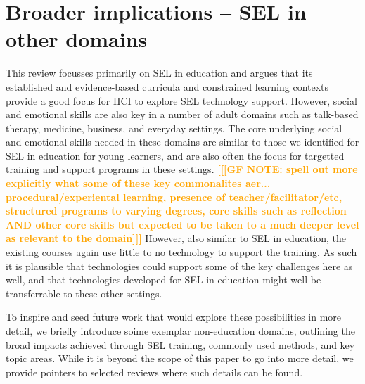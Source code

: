\documentclass[prodmode,acmtochi]{acmsmall}
\newcommand{\Geraldine}[1]{\textrm{\textbf{\textcolor{Orange}{[[#1]]}}}}
\newcommand{\rephrase}[1]{\textrm{\textrm{\textcolor{gray}{#1}}}}
\begin{document}
\section{Broader implications -- SEL in other domains}
\label{sec:linkDomains}
This review focusses primarily on SEL in education and argues that its established and evidence-based curricula and constrained learning contexts provide a good focus for HCI to explore SEL technology support. However, social and emotional skills are also key in a number of adult domains such as talk-based therapy, medicine, business, and everyday settings. The core underlying social and emotional skills needed in these domains are similar to those we identified for SEL in education for young learners, and are also often the focus for targetted training and support programs in these settings. 
\Geraldine{[GF NOTE: spell out more explicitly what some of these key commonalites aer... procedural/experiental learning, presence of teacher/facilitator/etc, structured programs to varying degrees, core skills such as reflection AND other core skills but expected to be taken to a much deeper level as relevant to the domain]}
However, also similar to SEL in education, the existing courses again use little to no technology to support the training. As such it is plausible that technologies could support some of the key challenges here as well, and that technologies developed for SEL in education might well be transferrable to these other settings.

To inspire and seed future work that would explore these possibilities in more detail, we briefly introduce soime exemplar non-education domains, outlining the broad impacts achieved through SEL training, commonly used methods, and key topic areas. While it is beyond the scope of this paper to go into more detail, we provide pointers to selected reviews where such details can be found.
 
  



\end{document}
